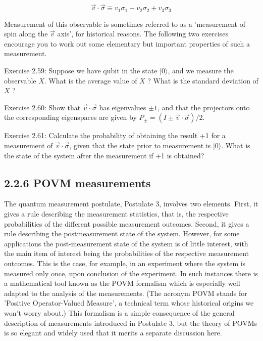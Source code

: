 \documentclass[10pt]{article}
\begin{document}
\begin{equation*}
\vec{v} \cdot \vec{\sigma} \equiv v_{1} \sigma_{1}+v_{2} \sigma_{2}+v_{3} \sigma_{3} \tag{2.116}
\end{equation*}


Measurement of this observable is sometimes referred to as a 'measurement of spin along the $\vec{v}$ axis', for historical reasons. The following two exercises encourage you to work out some elementary but important properties of such a measurement.

Exercise 2.59: Suppose we have qubit in the state $|0\rangle$, and we measure the observable $X$. What is the average value of $X$ ? What is the standard deviation of $X$ ?

Exercise 2.60: Show that $\vec{v} \cdot \vec{\sigma}$ has eigenvalues $\pm 1$, and that the projectors onto the corresponding eigenspaces are given by $P_{ \pm}=(I \pm \vec{v} \cdot \vec{\sigma}) / 2$.

Exercise 2.61: Calculate the probability of obtaining the result +1 for a measurement of $\vec{v} \cdot \vec{\sigma}$, given that the state prior to measurement is $|0\rangle$. What is the state of the system after the measurement if +1 is obtained?

\subsection*{2.2.6 POVM measurements}
The quantum measurement postulate, Postulate 3, involves two elements. First, it gives a rule describing the measurement statistics, that is, the respective probabilities of the different possible measurement outcomes. Second, it gives a rule describing the postmeasurement state of the system. However, for some applications the post-measurement state of the system is of little interest, with the main item of interest being the probabilities of the respective measurement outcomes. This is the case, for example, in an experiment where the system is measured only once, upon conclusion of the experiment. In such instances there is a mathematical tool known as the POVM formalism which is especially well adapted to the analysis of the measurements. (The acronym POVM stands for 'Positive Operator-Valued Measure', a technical term whose historical origins we won't worry about.) This formalism is a simple consequence of the general description of measurements introduced in Postulate 3, but the theory of POVMs is so elegant and widely used that it merits a separate discussion here.
\end{document}
